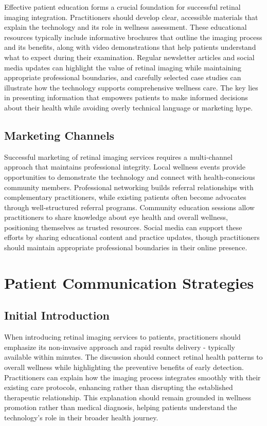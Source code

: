 \documentclass[
  Letterpaper,
]{scrbook}
\begin{document}
Effective patient education forms a crucial foundation for successful
retinal imaging integration. Practitioners should develop clear,
accessible materials that explain the technology and its role in
wellness assessment. These educational resources typically include
informative brochures that outline the imaging process and its benefits,
along with video demonstrations that help patients understand what to
expect during their examination. Regular newsletter articles and social
media updates can highlight the value of retinal imaging while
maintaining appropriate professional boundaries, and carefully selected
case studies can illustrate how the technology supports comprehensive
wellness care. The key lies in presenting information that empowers
patients to make informed decisions about their health while avoiding
overly technical language or marketing hype.

\subsection{Marketing Channels}\label{marketing-channels}

Successful marketing of retinal imaging services requires a
multi-channel approach that maintains professional integrity. Local
wellness events provide opportunities to demonstrate the technology and
connect with health-conscious community members. Professional networking
builds referral relationships with complementary practitioners, while
existing patients often become advocates through well-structured
referral programs. Community education sessions allow practitioners to
share knowledge about eye health and overall wellness, positioning
themselves as trusted resources. Social media can support these efforts
by sharing educational content and practice updates, though
practitioners should maintain appropriate professional boundaries in
their online presence.

\section{Patient Communication
Strategies}\label{patient-communication-strategies}

\subsection{Initial Introduction}\label{initial-introduction}

When introducing retinal imaging services to patients, practitioners
should emphasize its non-invasive approach and rapid results delivery -
typically available within minutes. The discussion should connect
retinal health patterns to overall wellness while highlighting the
preventive benefits of early detection. Practitioners can explain how
the imaging process integrates smoothly with their existing care
protocols, enhancing rather than disrupting the established therapeutic
relationship. This explanation should remain grounded in wellness
promotion rather than medical diagnosis, helping patients understand the
technology's role in their broader health journey.
\end{document}
